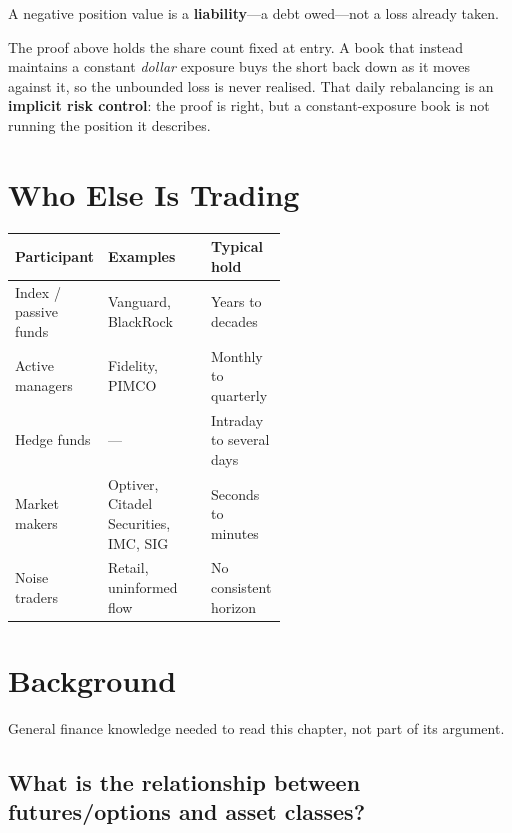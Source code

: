 \begin{note}
A negative position value is a \textbf{liability}---a debt owed---not a loss already taken.
\end{note}

\begin{note}
The proof above holds the share count fixed at entry. A book that instead maintains a constant
\emph{dollar} exposure buys the short back down as it moves against it, so the unbounded loss is
never realised. That daily rebalancing is an \textbf{implicit risk control}: the proof is right, but
a constant-exposure book is not running the position it describes.
\end{note}



\section{Who Else Is Trading}\label{sec:who-else}

\begin{tabularx}{\linewidth}{|>{\raggedright\arraybackslash}p{0.26\linewidth}|X|>{\raggedright\arraybackslash}p{0.28\linewidth}|}
\hline
\textbf{Participant} & \textbf{Examples} & \textbf{Typical hold} \\ \hline
Index / passive funds & Vanguard, BlackRock & Years to decades \\ \hline
Active managers & Fidelity, PIMCO & Monthly to quarterly \\ \hline
Hedge funds & --- & Intraday to several days \\ \hline
Market makers & Optiver, Citadel Securities, IMC, SIG & Seconds to minutes \\ \hline
Noise traders & Retail, uninformed flow & No consistent horizon \\ \hline
\end{tabularx}


\section*{Background}

General finance knowledge needed to read this chapter, not part of its argument.

\subsection*{What is the relationship between futures/options and asset classes?}

